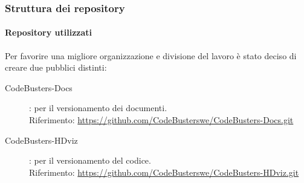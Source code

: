 \subsubsection{Struttura dei repository}
\paragraph{Repository utilizzati}
Per favorire una migliore organizzazione e divisione del lavoro è stato deciso di creare due  pubblici distinti:
\begin{description}
	\item[CodeBusters-Docs] : per il versionamento dei documenti. \\
	Riferimento: \textcolor{blue}{\url{https://github.com/CodeBusterswe/CodeBusters-Docs.git}}
	\item[CodeBusters-HDviz] : per il versionamento del codice. \\
	Riferimento: \textcolor{blue}{\url{https://github.com/CodeBusterswe/CodeBusters-HDviz.git}}
\end{description}


